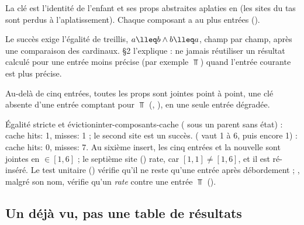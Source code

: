 
La clé est l'identité de l'enfant et ses props abstraites aplaties en  (les
sites du tas sont perdus à l'aplatissement). Chaque composant a au plus
 entrées ().


Le succès exige l'égalité de treillis, $a \lleq b \wedge b \lleq a$, champ par champ, après une
comparaison des cardinaux.  §2 l'explique : ne jamais réutiliser un résultat calculé
pour une entrée moins précise (par exemple $\Top$) quand l'entrée courante est plus précise.


Au-delà de cinq entrées, toutes les props sont jointes point à point, une clé absente d'une
entrée comptant pour $\Top$ (, ),
en une seule entrée dégradée.

\begin{exemple}{Égalité stricte et éviction}{inter-composants-cache}
 ( sous un parent sans état) :
\og cache hits: 1, misses: 1\fg{} ; le second site est un succès. 
( vaut 1 à 6, puis encore 1) : \og cache hits: 0, misses: 7\fg. Au sixième insert, les
cinq entrées et la nouvelle sont jointes en  $\in [1,6]$ ; le septième site
() rate, car $[1,1] \neq [1,6]$, et il est ré-inséré. Le test unitaire
 () vérifie qu'il ne
reste qu'une entrée après débordement ; , malgré
son nom, vérifie qu'un  \emph{rate} contre une entrée $\Top$
().
\end{exemple}

\subsection{Un \og déjà vu\fg{}, pas une table de résultats}

